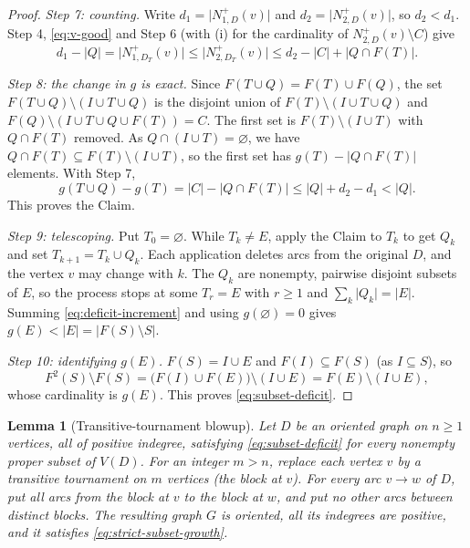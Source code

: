 \documentclass[11pt]{article}
\newtheorem{lemma}[theorem]{Lemma}
\theoremstyle{remark}
\newcommand{\abs}[1]{\lvert #1\rvert}
\begin{document}
\begin{proof}
\smallskip\noindent\emph{Step 7: counting.}
Write $d_1=\abs{N_{1,D}^+(v)}$ and $d_2=\abs{N_{2,D}^+(v)}$, so $d_2<d_1$.
Step 4, \eqref{eq:v-good} and Step 6 (with (i) for the cardinality of
$N_{2,D}^+(v)\setminus C$) give
\[
  d_1-\abs{Q}=\abs{N_{1,D_T}^+(v)}
  \le \abs{N_{2,D_T}^+(v)}
  \le d_2-\abs{C}+\abs{Q\cap F(T)}.
\]

\smallskip\noindent\emph{Step 8: the change in $g$ is exact.}
Since $F(T\cup Q)=F(T)\cup F(Q)$, the set
$F(T\cup Q)\setminus(I\cup T\cup Q)$ is the disjoint union of
$F(T)\setminus(I\cup T\cup Q)$ and
$F(Q)\setminus(I\cup T\cup Q\cup F(T))=C$.
The first set is $F(T)\setminus(I\cup T)$ with $Q\cap F(T)$ removed.  As
$Q\cap(I\cup T)=\varnothing$, we have
$Q\cap F(T)\subseteq F(T)\setminus(I\cup T)$, so the first set has
$g(T)-\abs{Q\cap F(T)}$ elements.  With Step 7,
\begin{equation}
\label{eq:deficit-increment}
  g(T\cup Q)-g(T)
  =\abs{C}-\abs{Q\cap F(T)}
  \le \abs{Q}+d_2-d_1
  <\abs{Q}.
\end{equation}
This proves the Claim.

\smallskip\noindent\emph{Step 9: telescoping.}
Put $T_0=\varnothing$.  While $T_k\ne E$, apply the Claim to $T_k$ to get
$Q_k$ and set $T_{k+1}=T_k\cup Q_k$.  Each application deletes arcs from the
original $D$, and the vertex $v$ may change with $k$.  The $Q_k$ are
nonempty, pairwise disjoint subsets of $E$, so the process stops at some
$T_r=E$ with $r\ge1$ and $\sum_k\abs{Q_k}=\abs E$.  Summing
\eqref{eq:deficit-increment} and using $g(\varnothing)=0$ gives
$g(E)<\abs E=\abs{F(S)\setminus S}$.

\smallskip\noindent\emph{Step 10: identifying $g(E)$.}
$F(S)=I\cup E$ and $F(I)\subseteq F(S)$ (as $I\subseteq S$), so
\[
  F^2(S)\setminus F(S)
  =\bigl(F(I)\cup F(E)\bigr)\setminus(I\cup E)
  =F(E)\setminus(I\cup E),
\]
whose cardinality is $g(E)$.  This proves \eqref{eq:subset-deficit}.
\end{proof}

\begin{lemma}[Transitive-tournament blowup]
\label{lem:blowup}
Let $D$ be an oriented graph on $n\ge1$ vertices, all of positive
indegree, satisfying \eqref{eq:subset-deficit} for every nonempty proper
subset of $V(D)$.  For an integer $m>n$, replace each vertex $v$ by a
transitive tournament on $m$ vertices (the \emph{block} at $v$).  For every
arc $v\to w$ of $D$, put all arcs from the block at $v$ to the block at $w$,
and put no other arcs between distinct blocks.  The resulting graph $G$ is
oriented, all its indegrees are positive, and it satisfies
\eqref{eq:strict-subset-growth}.
\end{lemma}
\end{document}
